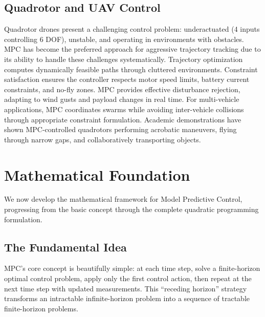 \subsection{Quadrotor and UAV Control}

Quadrotor drones present a challenging control problem: underactuated (4 inputs controlling 6 DOF), unstable, and operating in environments with obstacles. MPC has become the preferred approach for aggressive trajectory tracking due to its ability to handle these challenges systematically. Trajectory optimization computes dynamically feasible paths through cluttered environments. Constraint satisfaction ensures the controller respects motor speed limits, battery current constraints, and no-fly zones. MPC provides effective disturbance rejection, adapting to wind gusts and payload changes in real time. For multi-vehicle applications, MPC coordinates swarms while avoiding inter-vehicle collisions through appropriate constraint formulation. Academic demonstrations have shown MPC-controlled quadrotors performing acrobatic maneuvers, flying through narrow gaps, and collaboratively transporting objects.

\section{Mathematical Foundation}
\label{sec:math}

We now develop the mathematical framework for Model Predictive Control, progressing from the basic concept through the complete quadratic programming formulation.

\subsection{The Fundamental Idea}

MPC's core concept is beautifully simple: at each time step, solve a finite-horizon optimal control problem, apply only the first control action, then repeat at the next time step with updated measurements. This ``receding horizon'' strategy transforms an intractable infinite-horizon problem into a sequence of tractable finite-horizon problems.

